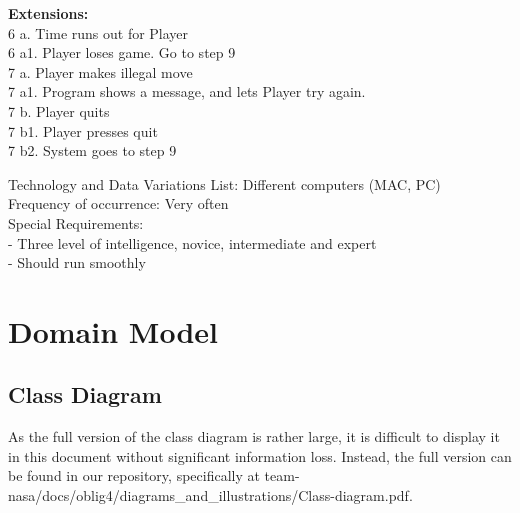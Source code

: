 \documentclass{article}
\begin{document}
\begin{flushleft}
\textbf{Extensions:}\\
6 a. Time runs out for Player\\
6 a1. Player loses game. Go to step 9\\
7 a. Player makes illegal move\\
7 a1. Program shows a message, and lets Player try again.\\
7 b. Player quits\\
7 b1. Player presses quit\\
7 b2. System goes to step 9\\
\vspace{3mm}

Technology and Data Variations List:\hspace{3mm} Different computers (MAC, PC)\\
Frequency of occurrence:\hspace{3mm} Very often\\
Special Requirements:\\
\hspace{5mm} - Three level of intelligence, novice, intermediate and expert\\
\hspace{5mm} - Should run smoothly\\
\vspace{10mm}

\newpage
\section{Domain Model}
\subsection{Class Diagram}
As the full version of the class diagram is rather large, it is difficult to display it in this document without significant information loss. Instead, the full version can be found in our repository, specifically at team-nasa/docs/oblig4/diagrams\_and\_illustrations/Class-diagram.pdf.

	
\end{flushleft}
\end{document}
